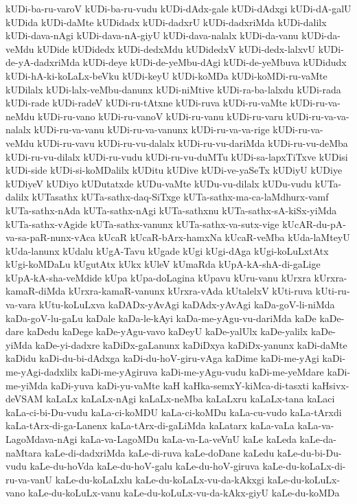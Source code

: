 {kUDi-ba-ru-varoV
kUDi-ba-ru-vudu
kUDi-dAdx-gale
kUDi-dAdxgi
kUDi-dA-galU
kUDida
kUDi-daMte
kUDidadx
kUDi-dadxrU
kUDi-dadxriMda
kUDi-dalilx
kUDi-dava-nAgi
kUDi-dava-nA-giyU
kUDi-dava-nalalx
kUDi-da-vanu
kUDi-da-veMdu
kUDide
kUDidedx
kUDi-dedxMdu
kUDidedxV
kUDi-dedx-lalxvU
kUDi-de-yA-dadxriMda
kUDi-deye
kUDi-de-yeMbu-dAgi
kUDi-de-yeMbuva
kUDidudx
kUDi-hA-ki-koLaLx-beVku
kUDi-keyU
kUDi-koMDa
kUDi-koMDi-ru-vaMte
kUDilalx
kUDi-lalx-veMbu-danunx
kUDi-niMtive
kUDi-ra-ba-lalxdu
kUDi-rada
kUDi-rade
kUDi-radeV
kUDi-ru-tAtxne
kUDi-ruva
kUDi-ru-vaMte
kUDi-ru-va-neMdu
kUDi-ru-vano
kUDi-ru-vanoV
kUDi-ru-vanu
kUDi-ru-varu
kUDi-ru-va-va-nalalx
kUDi-ru-va-vanu
kUDi-ru-va-vanunx
kUDi-ru-va-va-rige
kUDi-ru-va-veMdu
kUDi-ru-vavu
kUDi-ru-vu-dalalx
kUDi-ru-vu-dariMda
kUDi-ru-vu-deMba
kUDi-ru-vu-dilalx
kUDi-ru-vudu
kUDi-ru-vu-duMTu
kUDi-sa-lapxTiTxve
kUDisi
kUDi-side
kUDi-si-koMDalilx
kUDitu
kUDive
kUDi-ve-yaSeTx
kUDiyU
kUDiye
kUDiyeV
kUDiyo
kUDutatxde
kUDu-vaMte
kUDu-vu-dilalx
kUDu-vudu
kUTa-dalilx
kUTasathx
kUTa-sathx-daq-SiTxge
kUTa-sathx-ma-ca-laMdhurx-vamf
kUTa-sathx-nAda
kUTa-sathx-nAgi
kUTa-sathxnu
kUTa-sathx-sA-kiSx-yiMda
kUTa-sathx-vAgide
kUTa-sathx-vanunx
kUTa-sathx-va-sutx-vige
kUcAR-du-pA-va-sa-paR-nunx-vAca
kUcaR
kUcaR-bArx-hamxNa
kUcaR-veMba
kUda-laMteyU
kUda-lanunx
kUdalu
kUgA-Tavu
kUgade
kUgi
kUgi-dAga
kUgi-koLuLxtAtx
kUgi-koMDaLu
kUgutAtx
kUkx
kUleV
kUmaRda
kUpA-kA-shA-di-gaLige
kUpA-kA-sha-veMdide
kUpa
kUpa-doLagina
kUpavu
kUru-vanu
kUrxra
kUrxra-kamaR-diMda
kUrxra-kamaR-vanunx
kUrxra-vAda
kUtalelxV
kUti-ruva
kUti-ru-va-vara
kUtu-koLuLxva
kaDADx-yAvAgi
kaDAdx-yAvAgi
kaDa-goV-li-niMda
kaDa-goV-lu-gaLu
kaDale
kaDa-le-kAyi
kaDa-me-yAgu-vu-dariMda
kaDe
kaDe-dare
kaDedu
kaDege
kaDe-yAgu-vavo
kaDeyU
kaDe-yalUlx
kaDe-yalilx
kaDe-yiMda
kaDe-yi-dadxre
kaDiDx-gaLanunx
kaDiDxya
kaDiDx-yanunx
kaDi-daMte
kaDidu
kaDi-du-bi-dAdxga
kaDi-du-hoV-giru-vAga
kaDime
kaDi-me-yAgi
kaDi-me-yAgi-dadxlilx
kaDi-me-yAgiruva
kaDi-me-yAgu-vudu
kaDi-me-yeMdare
kaDi-me-yiMda
kaDi-yuva
kaDi-yu-vaMte
kaH
kaHka-semxY-kiMca-di-tasxti
kaHsivx-deVSAM
kaLaLx
kaLaLx-nAgi
kaLaLx-neMba
kaLaLxru
kaLaLx-tana
kaLaci
kaLa-ci-bi-Du-vudu
kaLa-ci-koMDU
kaLa-ci-koMDu
kaLa-cu-vudo
kaLa-tArxdi
kaLa-tArx-di-ga-Lanenx
kaLa-tArx-di-gaLiMda
kaLatarx
kaLa-vaLa
kaLa-va-LagoMdava-nAgi
kaLa-va-LagoMDu
kaLa-va-La-veVnU
kaLe
kaLeda
kaLe-da-naMtara
kaLe-di-dadxriMda
kaLe-di-ruva
kaLe-doDane
kaLedu
kaLe-du-bi-Du-vudu
kaLe-du-hoVda
kaLe-du-hoV-galu
kaLe-du-hoV-giruva
kaLe-du-koLaLx-di-ru-va-vanU
kaLe-du-koLaLxlu
kaLe-du-koLaLx-vu-da-kAkxgi
kaLe-du-koLuLx-vano
kaLe-du-koLuLx-vanu
kaLe-du-koLuLx-vu-da-kAkx-giyU
kaLe-du-koMDa
}
